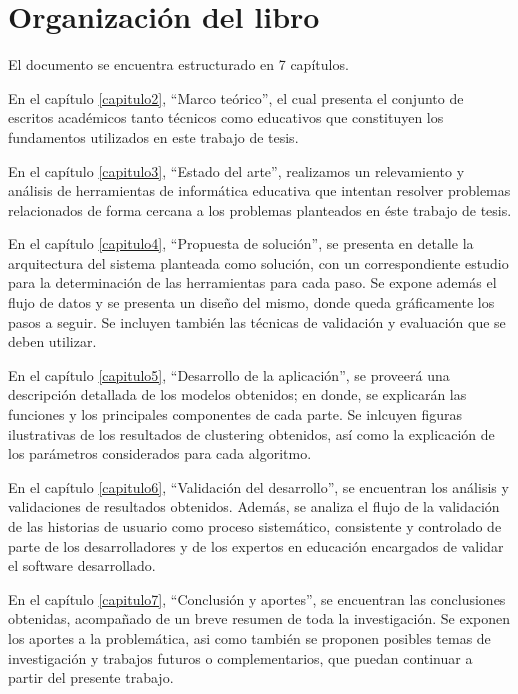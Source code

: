 \section{Organización del libro}
El documento se encuentra estructurado en 7 capítulos. 

En el capítulo \ref{capitulo2}, \enquote{Marco teórico}, el cual presenta el conjunto de escritos académicos tanto técnicos como educativos que constituyen los fundamentos utilizados en este trabajo de tesis.

En el capítulo \ref{capitulo3}, \enquote{Estado del arte}, realizamos un relevamiento y análisis de herramientas de informática educativa que intentan resolver problemas relacionados de forma cercana a los problemas planteados en éste trabajo de tesis.

En el capítulo \ref{capitulo4}, \enquote{Propuesta de solución}, se presenta en detalle la arquitectura del sistema planteada como solución, con un correspondiente estudio para la determinación de las herramientas para cada paso. Se expone además el flujo de datos y se presenta un diseño del mismo, donde queda gráficamente los pasos a seguir. Se incluyen también las técnicas de validación y evaluación que se deben utilizar.

En el capítulo \ref{capitulo5}, \enquote{Desarrollo de la aplicación}, se proveerá una descripción detallada de los modelos obtenidos; en donde, se explicarán las funciones y los principales componentes de cada parte. Se inlcuyen figuras ilustrativas de los resultados de clustering obtenidos, así como la explicación de los parámetros considerados para cada algoritmo.

En el capítulo \ref{capitulo6}, \enquote{Validación del desarrollo}, se encuentran los análisis y validaciones de resultados obtenidos. Además, se analiza el flujo de la validación de las historias de usuario como proceso sistemático, consistente y controlado de parte de los desarrolladores y de los expertos en educación encargados de validar el software desarrollado.

En el capítulo \ref{capitulo7}, \enquote{Conclusión y aportes}, se encuentran las conclusiones obtenidas, acompañado de un breve resumen de toda la investigación. Se exponen los aportes a la problemática, asi como también se proponen posibles temas de investigación y trabajos futuros o complementarios, que puedan continuar a partir del presente trabajo.

